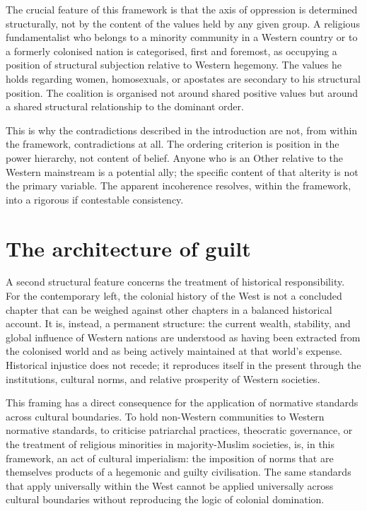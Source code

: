 	The crucial feature of this framework is that the axis of oppression is determined
	structurally, not by the content of the values held by any given group. A religious
	fundamentalist who belongs to a minority community in a Western country or to a
	formerly colonised nation is categorised, first and foremost, as occupying a
	position of structural subjection relative to Western hegemony. The values he holds
	regarding women, homosexuals, or apostates are secondary to his structural position.
	The coalition is organised not around shared positive values but around a shared
	structural relationship to the dominant order.
	
	This is why the contradictions described in the introduction are not, from within
	the framework, contradictions at all. The ordering criterion is position in the
	power hierarchy, not content of belief. Anyone who is an Other relative to the
	Western mainstream is a potential ally; the specific content of that alterity is
	not the primary variable. The apparent incoherence resolves, within the framework,
	into a rigorous if contestable consistency.
	
	\section{The architecture of guilt}
	
	A second structural feature concerns the treatment of historical responsibility.
	For the contemporary left, the colonial history of the West is not a concluded
	chapter that can be weighed against other chapters in a balanced historical account.
	It is, instead, a permanent structure: the current wealth, stability, and global
	influence of Western nations are understood as having been extracted from the
	colonised world and as being actively maintained at that world's expense. Historical
	injustice does not recede; it reproduces itself in the present through the
	institutions, cultural norms, and relative prosperity of Western societies.
	
	This framing has a direct consequence for the application of normative standards
	across cultural boundaries. To hold non-Western communities to Western normative
	standards, to criticise patriarchal practices, theocratic governance, or the
	treatment of religious minorities in majority-Muslim societies, is, in this
	framework, an act of cultural imperialism: the imposition of norms that are
	themselves products of a hegemonic and guilty civilisation. The same standards
	that apply universally within the West cannot be applied universally across cultural
	boundaries without reproducing the logic of colonial domination.
	
